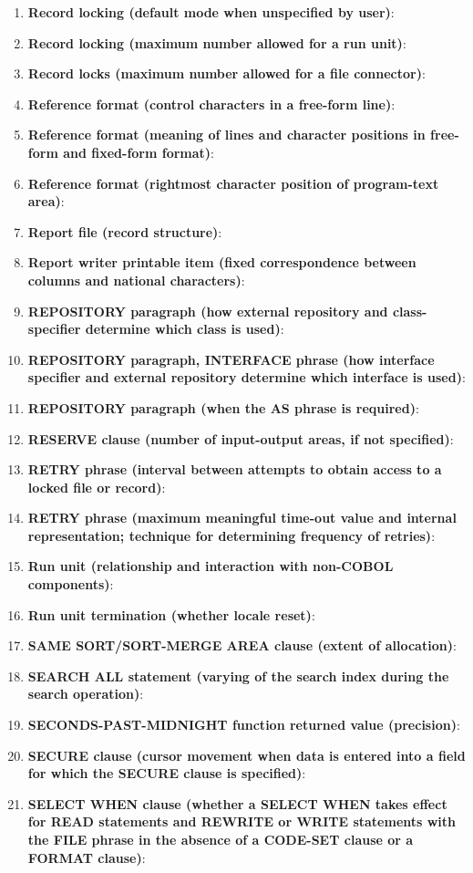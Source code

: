 \begin{enumerate}
\item \textbf{Record locking (default mode when unspecified by user)}:
\item \textbf{Record locking (maximum number allowed for a run unit)}:
\item \textbf{Record locks (maximum number allowed for a file connector)}:
\item \textbf{Reference format (control characters in a free-form line)}:
\item \textbf{Reference format (meaning of lines and character positions in free-form and fixed-form format)}:
\item \textbf{Reference format (rightmost character position of program-text area)}:
\item \textbf{Report file (record structure)}:
\item \textbf{Report writer printable item (fixed correspondence between columns and national characters)}:
\item \textbf{REPOSITORY paragraph (how external repository and class-specifier determine which class is used)}:
\item \textbf{REPOSITORY paragraph, INTERFACE phrase (how interface specifier and external repository determine which interface is used)}:
\item \textbf{REPOSITORY paragraph (when the AS phrase is required)}:
\item \textbf{RESERVE clause (number of input-output areas, if not specified)}:
\item \textbf{RETRY phrase (interval between attempts to obtain access to a locked file or record)}:
\item \textbf{RETRY phrase (maximum meaningful time-out value and internal representation; technique for determining frequency of retries)}:
\item \textbf{Run unit (relationship and interaction with non-COBOL components)}:
\item \textbf{Run unit termination (whether locale reset)}:
\item \textbf{SAME SORT/SORT-MERGE AREA clause (extent of allocation)}:
\item \textbf{SEARCH ALL statement (varying of the search index during the search operation)}:
\item \textbf{SECONDS-PAST-MIDNIGHT function returned value (precision)}:
\item \textbf{SECURE clause (cursor movement when data is entered into a field for which the SECURE clause is specified)}:
\item \textbf{SELECT WHEN clause (whether a SELECT WHEN takes effect for READ statements and REWRITE or WRITE statements with the FILE phrase in the absence of a CODE-SET clause or a FORMAT clause)}:

\end{enumerate}
